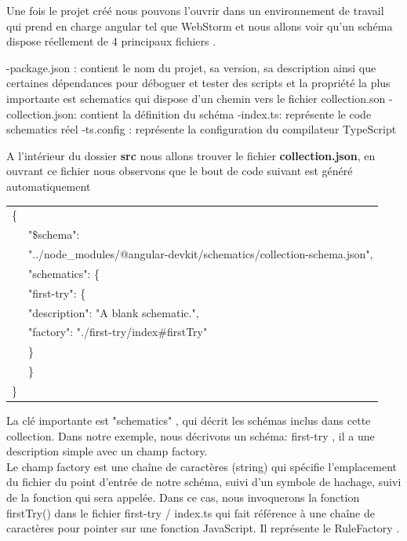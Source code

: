\documentclass[12pt,french]{article}
\begin{document}
	 Une fois le projet créé nous pouvons l’ouvrir dans un environnement de travail qui prend en charge angular tel que WebStorm et nous allons voir qu’un schéma dispose réellement de 4 principaux fichiers .\newline

	-package.json : contient le nom du projet, sa version, sa description ainsi que certaines dépendances pour déboguer et tester des scripts et la propriété la plus importante est schematics qui dispose d’un chemin vers le fichier collection.son\smallbreak
	-collection.json: contient la définition du schéma\smallbreak
	-index.ts: représente le code schematics réel\smallbreak
	-ts.config : représente la configuration du compilateur TypeScript\newline
	
	A l'intérieur du dossier \textbf{src} nous allons trouver le fichier \textbf{collection.json}, en ouvrant ce fichier nous observons que le bout de code suivant est généré automatiquement\newline
	
	\begin{tabular}{ll}
		\{&\\
		&"\$schema":\\ &"../node\_modules/@angular-devkit/schematics/collection-schema.json",\\
		&"schematics": \{\\
		&\quad"first-try": \{
\\
		&\qquad"description": "A blank schematic.",
\\
		&\qquad"factory": "./first-try/index\#firstTry"\\
		&\quad \}
\\
		& \}
\\
		\}
	\end{tabular}\break

	La clé importante est "schematics" , qui décrit les schémas inclus dans cette collection. 
	Dans notre exemple, nous décrivons un schéma: first-try , il a une description simple avec un champ factory.\\
	Le champ factory est une chaîne de caractères (string) qui spécifie l'emplacement du fichier du point d'entrée de notre schéma, suivi d'un symbole de hachage, suivi de la fonction qui sera appelée. Dans  ce cas, nous invoquerons la fonction firstTry() dans le fichier first-try / index.ts  qui fait référence à une chaîne de caractères pour pointer sur une fonction JavaScript. Il représente le RuleFactory .\newline 
	
\end{document}
